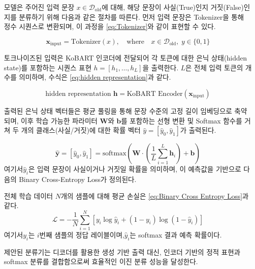 \documentclass[a4paper,fleqn]{cas-sc}
\begin{document}
모델은 주어진 입력 문장 \( x \in \mathcal{D}_{\text{old}} \)에 대해, 해당 문장이 사실(True)인지 거짓(False)인지를 분류하기 위해 다음과 같은 절차를 따른다.
먼저 입력 문장은 Tokenizer을 통해 정수 시퀀스로 변환되며, 이 과정을 \cref{eq:Tokenizer}와 같이 표현할 수 있다.

\begin{equation}
    \mathbf{x}_{\text{input}} = \text{Tokenizer}(x), \quad \text{where} \quad x \in \mathcal{D}_{\text{old}}, \; y \in \{0, 1\}
    \label{eq:Tokenizer}
\end{equation}

토크나이즈된 입력은 KoBART 인코더에 전달되어 각 토큰에 대한 은닉 상태(hidden state)를 포함하는 시퀀스 표현 \(h = [h_{1}, \ldots, h_{L}]\)을 출력한다. 
\( L \)은 전체 입력 토큰의 개수를 의미하며, 수식은 \cref{eq:hidden representation}과 같다.

\begin{equation}
    \text{hidden representation } \mathbf{h}  = \text{KoBART Encoder}(\mathbf{x}_{\text{input}}) 
    \label{eq:hidden representation}
\end{equation}

출력된 은닉 상태 벡터들은 평균 풀링을 통해 문장 수준의 고정 길이 임베딩으로 축약되며, 이후 학습 가능한 파라미터  \(\mathbf{W}\)와 \(\mathbf{b}\)를 포함하는 선형 변환 및 Softmax 함수를 거쳐 두 개의 클래스(사실/거짓)에 대한 확률 벡터 \(\hat{y} = [\hat{y}_{0}, \hat{y}_{1}]\)가 출력된다.

\begin{equation}
    \hat{\mathbf{y}} = [\hat{y}_{0}, \hat{y}_{1}] 
    = \mathrm{softmax}\left( \mathbf{W} \cdot \left( \frac{1}{L} \sum_{i=1}^{L} \mathbf{h}_i \right) + \mathbf{b} \right)
\end{equation}
\noindent
여기서 ​\(\hat{y}_i\)은 입력 문장이 사실이거나 거짓일 확률을 의미하며, 이 예측값을 기반으로 다음의 Binary Cross-Entropy Loss가 정의된다. 

전체 학습 데이터 \(N\)개의 샘플에 대해 평균 손실은 \cref{eq:Binary Cross Entropy Loss}과 같다.
\begin{equation}
    \mathcal{L} = -\frac{1}{N} \sum_{i=1}^{N} \left[ y_i \log \hat{y}_i + (1 - y_i) \log (1 - \hat{y}_i) \right]
    \label{eq:Binary Cross Entropy Loss}
\end{equation}
\noindent
여기서 ​\({y}_i\)는 \(i\)번째 샘플의 정답 레이블이며, ​\(\hat{y}_i\)는 softmax 결과 예측 확률이다. 

제안된 분류기는 디코더를 활용한 생성 기반 출력 대신, 인코더 기반의 정적 표현과 softmax 분류를 결합함으로써 효율적인 이진 분류 성능을 달성한다. 
\end{document}
